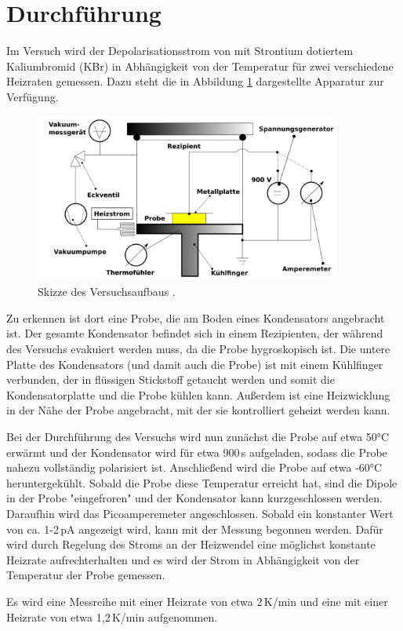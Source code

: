 \section{Durchführung}
\label{sec:Durchführung}

Im Versuch wird der Depolarisationsstrom von mit Strontium dotiertem Kaliumbromid (KBr) in Abhängigkeit
von der Temperatur für zwei verschiedene Heizraten gemessen. Dazu steht die in
Abbildung \ref{fig:aufbau} dargestellte Apparatur zur Verfügung.

\begin{figure}
  \centering
  \includegraphics[width=0.9\textwidth]{data/aufbau.png}
  \caption{Skizze des Versuchsaufbaus \cite{Versuchsanleitung}.}
  \label{fig:aufbau}
\end{figure}

Zu erkennen ist dort eine Probe, die am Boden eines Kondensators angebracht ist.
Der gesamte Kondensator befindet sich in einem Rezipienten, der während des
Versuchs evakuiert werden muss, da die Probe hygroskopisch ist. Die untere Platte
des Kondensators (und damit auch die Probe) ist mit einem Kühlfinger verbunden,
der in flüssigen Stickstoff getaucht werden und somit die Kondensatorplatte
und die Probe kühlen kann. Außerdem ist eine Heizwicklung in der Nähe der
Probe angebracht, mit der sie kontrolliert geheizt werden kann.

Bei der Durchführung des Versuchs wird nun zunächst die Probe auf etwa 50°C erwärmt
und der Kondensator wird für etwa 900\,s aufgeladen, sodass die Probe nahezu vollständig
polarisiert ist. Anschließend wird die Probe auf etwa -60°C heruntergekühlt.
Sobald die Probe diese Temperatur erreicht hat, sind die Dipole in der Probe
"eingefroren" und der Kondensator kann kurzgeschlossen werden. Daraufhin wird das
Picoamperemeter angeschlossen. Sobald ein konstanter Wert von ca. 1-2\,pA angezeigt
wird, kann mit der Messung begonnen werden. Dafür wird durch Regelung des Stroms
an der Heizwendel eine möglichst konstante Heizrate aufrechterhalten und es wird
der Strom in Abhängigkeit von der Temperatur der Probe gemessen.

Es wird eine Messreihe mit einer Heizrate von etwa 2\,K/min und eine mit einer Heizrate
von etwa 1{,}2\,K/min aufgenommen.
